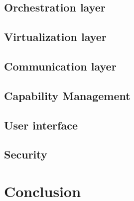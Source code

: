 \subsection{Orchestration layer}
\doit

\subsection{Virtualization layer}
\doit

\subsection{Communication layer}
\doit

\subsection{Capability Management}
\doit

\subsection{User interface}
\doit

\subsection{Security}
\doit

\section{Conclusion}
\doit




